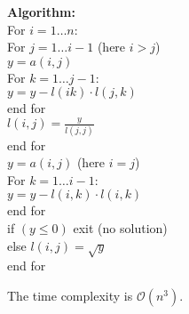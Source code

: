 \textbf{Algorithm:}\\
For $i=1 \dots n$:\\
\hspace*{0.5cm}For $j = 1 \dots i - 1$ (here $i > j$)\\
\hspace*{1cm} $y = a(i, j)$\\
\hspace*{1cm} For $k = 1 \dots j - 1$:\\
\hspace*{1.5cm} $y = y - l(ik) \cdot l(j, k)$\\
\hspace*{1cm} end for\\
\hspace*{1cm} $l(i, j) = \frac{y}{l(j, j)}$\\
\hspace*{0.5cm} end for\\
\hspace*{0.5cm} $y = a(i, j)$ (here $i = j$)\\
\hspace*{0.5cm} For $k = 1 \dots i - 1$:\\
\hspace*{1cm} $y = y - l(i, k) \cdot l(i, k)$\\
\hspace*{0.5cm} end for\\
\hspace*{0.5cm} if $(y \le 0)$ exit (no solution)\\
\hspace*{0.5cm} else $l(i, j) = \sqrt{y}$\\
end for

The time complexity is $\mathcal{O}(n^3)$.


